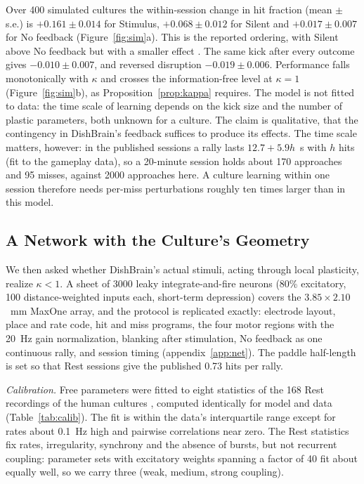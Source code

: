 \documentclass[12pt]{article}
\numberwithin{equation}{section}
\begin{document}
Over 400 simulated cultures the within-session change in hit fraction (mean $\pm$ s.e.) is $+0.161\pm0.014$ for Stimulus, $+0.068\pm0.012$ for Silent and $+0.017\pm0.007$ for No feedback (Figure~\ref{fig:sim}a). This is the reported ordering, with Silent above No feedback but with a smaller effect \citep{Kagan2022}. The same kick after every outcome gives $-0.010\pm0.007$, and reversed disruption $-0.019\pm0.006$. Performance falls monotonically with $\kappa$ and crosses the information-free level at $\kappa=1$ (Figure~\ref{fig:sim}b), as Proposition~\ref{prop:kappa} requires. The model is not fitted to data: the time scale of learning depends on the kick size and the number of plastic parameters, both unknown for a culture. The claim is qualitative, that the contingency in DishBrain's feedback suffices to produce its effects. The time scale matters, however: in the published sessions a rally lasts $12.7+5.9h$~s with $h$ hits (fit to the gameplay data), so a 20-minute session holds about 170 approaches and 95 misses, against 2000 approaches here. A culture learning within one session therefore needs per-miss perturbations roughly ten times larger than in this model.

\subsection{A Network with the Culture's Geometry}\label{sec:net}

We then asked whether DishBrain's actual stimuli, acting through local plasticity, realize $\kappa<1$. A sheet of 3000 leaky integrate-and-fire neurons (80\% excitatory, 100 distance-weighted inputs each, short-term depression) covers the $3.85\times2.10$~mm MaxOne array, and the protocol is replicated exactly: electrode layout, place and rate code, hit and miss programs, the four motor regions with the 20~Hz gain normalization, blanking after stimulation, No feedback as one continuous rally, and session timing (appendix~\ref{app:net}). The paddle half-length is set so that Rest sessions give the published 0.73 hits per rally.

\emph{Calibration.} Free parameters were fitted to eight statistics of the 168 Rest recordings of the human cultures \citep{Kagan2022}, computed identically for model and data (Table~\ref{tab:calib}). The fit is within the data's interquartile range except for rates about 0.1~Hz high and pairwise correlations near zero. The Rest statistics fix rates, irregularity, synchrony and the absence of bursts, but not recurrent coupling: parameter sets with excitatory weights spanning a factor of 40 fit about equally well, so we carry three (weak, medium, strong coupling).
\end{document}
